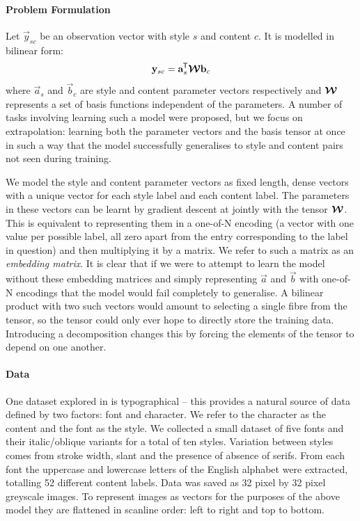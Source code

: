 \paragraph{Problem Formulation}
Let \(\vec{y}_{sc}\) be an observation vector with style \(s\) and content \(c\). It is modelled
in bilinear form:
\begin{equation}
	\mathbf{y}_{sc} = \mathbf{a}_s^{\mkern-1.5mu\mathsf{T}}\bm{\mathcal{W}}\mathbf{b}_c
\end{equation} where \(\vec{a}_s\) and \(\vec{b}_c\) are style and content parameter vectors
respectively and \(\bm{\mathcal{W}}\) represents a set of basis functions independent of the parameters.
A number of tasks involving learning such a model were proposed, but we focus on extrapolation:
 learning both the parameter vectors and the basis tensor at once in such a way that
the model successfully generalises to style and content pairs not seen during training.

We model the style and content parameter vectors as fixed length, dense vectors with a unique
vector for each style label and each content label. The parameters in these vectors can be
learnt by gradient descent at jointly with the tensor \(\bm{\mathcal{W}}\). This is equivalent
to representing them in a one-of-N encoding (a vector with one value per possible label, all
zero apart from the entry corresponding to the label in question) and then multiplying it by
a matrix. We refer to such a matrix as an \textit{embedding matrix}. It is clear that if we
were to attempt to learn the model without these embedding matrices and simply representing
\(\vec{a}\) and \(\vec{b}\) with one-of-N encodings that the model would fail completely to
generalise. A bilinear product with two such vectors would amount to selecting a single fibre
from the tensor, so the tensor could only ever hope to directly store the training data.
Introducing a decomposition changes this by forcing the elements of the tensor to depend on
one another.


\paragraph{Data}
One dataset explored in \autocite{Tenenbaum2000} is typographical -- this provides a natural
source of data defined by two factors: font and character. We refer to the character as the
content and the font as the style. We collected a small dataset of five fonts and their
italic/oblique variants for a total of ten styles. Variation between styles comes from stroke
width, slant and the presence of absence of serifs. From each font the uppercase and lowercase
letters of the English alphabet were extracted, totalling 52 different content labels. Data was
saved as 32 pixel by 32 pixel greyscale images. To represent images as vectors for the purposes
of the above model they are flattened in scanline order: left to right and top to bottom.

